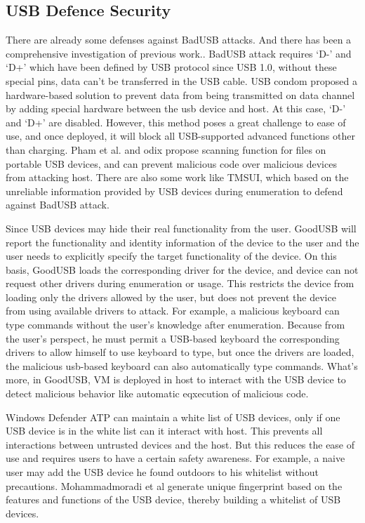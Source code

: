 \subsection{USB Defence Security}
\label{subsec:usb_defence}
There are already some defenses against BadUSB attacks. 
And there has been a comprehensive investigation of previous work.\cite{sok}.
BadUSB attack requires `D-' and `D+' which have been defined by USB protocol since USB 1.0\cite{usb10},
without these special pins, data can't be transferred in the USB cable. USB condom \cite{Condom} proposed a hardware-based solution to prevent data from being transmitted on data channel by adding special hardware between the usb device and host. At this case, `D-' and `D+' are disabled.
However, this method poses a great challenge to ease of use, and once deployed, it will block all USB-supported advanced functions other than charging. Pham et al. \cite{pham2010optimizing} and odix\cite{OLEA} propose scanning function for files on portable USB devices, and can prevent malicious code over malicious devices from attacking host.
There are also some work like TMSUI\cite{yang2015tmsui}, which based on the unreliable information provided by USB devices during enumeration to defend against BadUSB attack.

Since USB devices may hide their real functionality from the user. GoodUSB\cite{tian2015defending} will report the functionality and identity information of the device to the user and the user needs to explicitly specify the target functionality of the device. On this basis, GoodUSB loads the corresponding driver for the device, and device can not request other drivers during enumeration or usage. This restricts the device from loading only the drivers allowed by the user, but does not prevent the device from using available drivers to attack. For example, a malicious keyboard can type commands without the user's knowledge after enumeration. Because from the user's perspect, he must permit a USB-based keyboard the corresponding drivers to allow himself to use keyboard to type, but once the drivers are loaded, the malicious usb-based keyboard can also automatically type commands. What's more, in GoodUSB, VM is deployed in host to interact with the USB device to detect malicious behavior like automatic eqxecution of malicious code.
 
Windows Defender ATP\cite{windenfenderwhite} can maintain a white list of USB devices, only if one USB device is in the white list can it interact with host. This prevents all interactions between untrusted devices and the host. But this reduces the ease of use and requires users to have a certain safety awareness. For example, a naive user may add the USB device he found outdoors to his whitelist without precautions. Mohammadmoradi et al\cite{mohammadmoradi2018making} generate unique fingerprint based on the features and functions of the USB device, thereby building a whitelist of USB devices.

